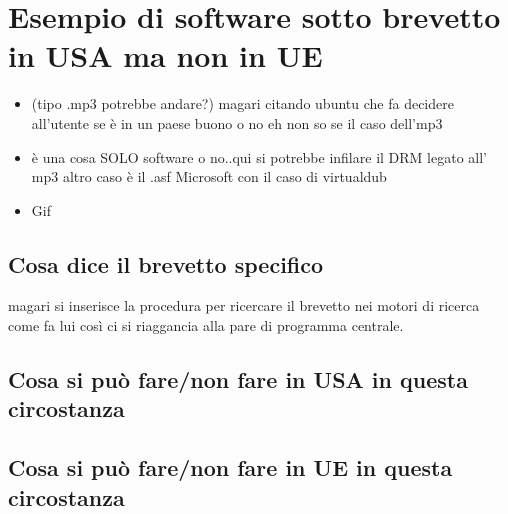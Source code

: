 \chapter{Esempio di software sotto brevetto in USA ma non in UE}

\begin{itemize}
 \item (tipo .mp3 potrebbe andare?) magari citando ubuntu che fa decidere all'utente se è in un paese buono o no eh non so se il caso dell'mp3 
\item è una cosa SOLO software o no..qui si potrebbe infilare il DRM legato all' mp3
altro caso è il .asf Microsoft con il caso di virtualdub
\item Gif
\end{itemize}


\section{Cosa dice il brevetto specifico}
magari si inserisce la procedura per ricercare il brevetto nei motori di ricerca come fa lui
così ci si riaggancia alla pare di programma centrale.
\section{Cosa si può fare/non fare in USA in questa circostanza}
\section{Cosa si può fare/non fare in UE in questa circostanza}
